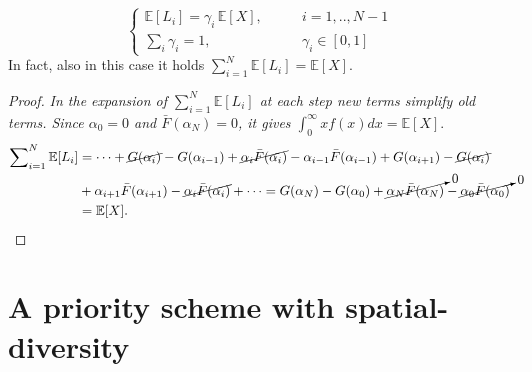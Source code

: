 \begin{equation}\label{eq:main-K-PQ}
\begin{cases}
\mathbb{E}[L_i] = \gamma_i \, \mathbb{E}[X],  \qquad &i = 1,..,N-1 \\
\sum_i \gamma_i = 1, \qquad &\gamma_i \in [0,1]
\end{cases}
\end{equation}
In fact, also in this case it holds $\sum_{i=1}^{N}\mathbb{E}[L_i] = \mathbb{E}[X]$.

\renewcommand{\qedsymbol}{\rule{0.5em}{0.5em}}
\begin{proof}
\textit{In the expansion of $\sum _{i=1}^{N}\mathbb{E}[L_i]$ at each step new terms simplify old terms. Since $\alpha_{\mathit{0}} = 0$ and $\bar{F}(\alpha_N) = 0$, it gives $\int_{0}^\infty x f(x) dx = \mathbb{E}[X]$}.
\small
\begin{align*}
	\sum\nolimits_{i=1}^{N}\mathbb{E}[L_i] &= \cdots + \cancel{G(\alpha_i)} - G(\alpha_{i-1}) + \cancel{\alpha_i \bar{F}(\alpha_i)} 
	-\alpha_{i-1}\bar{F}(\alpha_{i-1}) + G(\alpha_{i+1}) - \cancel{G(\alpha_{i})} \\ &+ \alpha_{i+1} \bar{F}(\alpha_{i+1})- \cancel{\alpha_{i}\bar{F}(\alpha_{i})} + \cdots 
	=G(\alpha_N) - G(\alpha_0) + \cancelto{0}{\alpha_N \bar{F}(\alpha_N)} -\cancelto{0}{\alpha_0\bar{F}(\alpha_0)} \\
	&=\mathbb{E}[X].
\end{align*}
\normalsize
\end{proof}

\section{A priority scheme with spatial-diversity}

